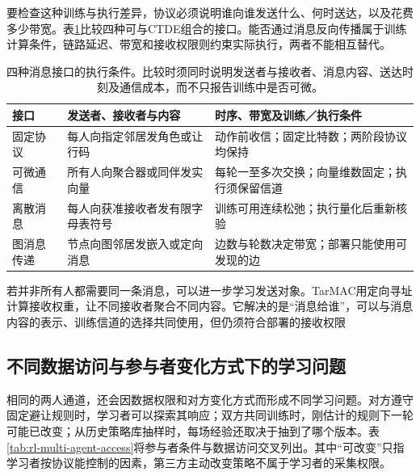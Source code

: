 要检查这种训练与执行差异，协议必须说明谁向谁发送什么、何时送达，以及花费多少带宽。表\ref{tab:rl-multi-agent-communication}比较四种可与CTDE组合的接口。能否通过消息反向传播属于训练计算条件，链路延迟、带宽和接收权限则约束实际执行，两者不能相互替代。

\begin{table}[htbp]
 \centering
 \begin{tabularx}{\linewidth}{@{}l >{\raggedright\arraybackslash}X >{\raggedright\arraybackslash}X@{}}
 \toprule
 接口 & 发送者、接收者与内容 & 时序、带宽及训练／执行条件\\
 \midrule
 固定协议 & 每人向指定邻居发角色或让行码 & 动作前收信；固定比特数；两阶段协议均保持\\
 可微通信 & 所有人向聚合器或同伴发实向量 & 每轮一至多次交换；向量维数固定；执行须保留信道\\
 离散消息 & 每人向获准接收者发有限字母表符号 & 训练可用连续松弛；执行量化后重新核验\\
 图消息传递 & 节点向图邻居发嵌入或定向消息 & 边数与轮数决定带宽；部署只能使用可发现的边\\
 \bottomrule
 \end{tabularx}
 \caption{四种消息接口的执行条件。比较时须同时说明发送者与接收者、消息内容、送达时刻及通信成本，而不只报告训练中是否可微。}
 \label{tab:rl-multi-agent-communication}
\end{table}

若并非所有人都需要同一条消息，可以进一步学习发送对象。TarMAC用定向寻址计算接收权重，让不同接收者聚合不同内容。它解决的是“消息给谁”，可以与消息内容的表示、训练信道的选择共同使用，但仍须符合部署的接收权限

\subsection{不同数据访问与参与者变化方式下的学习问题}
\label{sec:rl-multi-agent-access}

相同的两人通道，还会因数据权限和对方变化方式而形成不同学习问题。对方遵守固定避让规则时，学习者可以探索其响应；双方共同训练时，刚估计的规则下一轮可能已改变；从历史策略库抽样时，每场经验还取决于抽到了哪个版本。表\ref{tab:rl-multi-agent-access}将参与者条件与数据访问交叉列出。其中“可改变”只指学习者按协议能控制的因素，第三方主动改变策略不属于学习者的采集权限。

